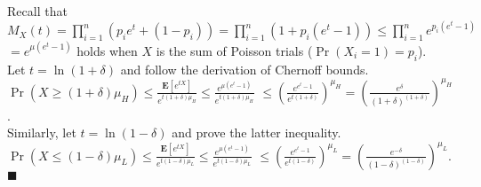 \documentclass{article}
\begin{document}
\subsection{}
Recall that $M_X(t)=\prod\limits_{i=1}^n (p_ie^t + (1-p_i)) = \prod\limits_{i=1}^n (1+p_i(e^t-1))\leq \prod\limits_{i=1}^ne^{p_i(e^t-1)}$\\
$=e^{\mu(e^t-1)}$ holds when $X$ is the sum of Poisson trials ($\Pr(X_i=1)=p_i$).\\
Let $t=\ln (1+\delta)$ and follow the derivation of Chernoff bounds.\\
$\Pr(X\geq (1+\delta)\mu_H) \leq \frac{\textbf{E}[e^{tX}]}{e^{t(1+\delta)\mu_H}}\leq\frac{e^{\mu(e^t-1)}}{e^{t(1+\delta)\mu_H}}$
$\leq \left( \frac{e^{e^t-1}}{e^{t(1+\delta)}}\right)^{\mu_H}=\left( \frac{e^\delta}{(1+\delta)^{(1+\delta)}}\right)^{\mu_H}$.\\
Similarly, let $t=\ln (1-\delta)$ and prove the latter inequality.\\
$\Pr(X\leq (1-\delta)\mu_L) \leq \frac{\textbf{E}[e^{tX}]}{e^{t(1-\delta)\mu_L}}\leq\frac{e^{\mu(e^t-1)}}{e^{t(1-\delta)\mu_L}}$
$\leq \left( \frac{e^{e^t-1}}{e^{t(1-\delta)}}\right)^{\mu_L}=\left( \frac{e^{-\delta}}{(1-\delta)^{(1-\delta)}}\right)^{\mu_L}$. $\blacksquare$
\end{document}
